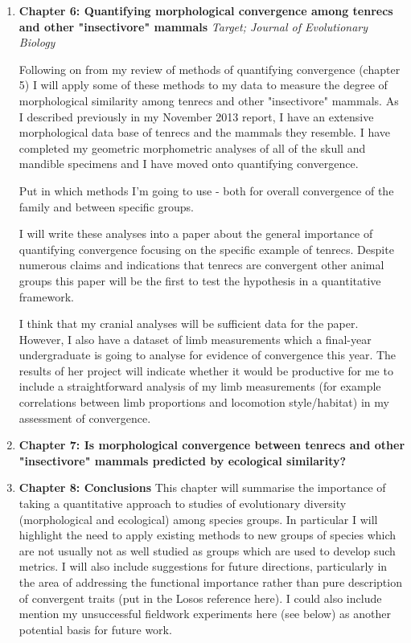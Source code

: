 \documentclass[12pt,a4paper]{article}
\begin{document}
\begin{enumerate}


\item \textbf{Chapter 6: Quantifying morphological convergence among tenrecs and other "insectivore" mammals}
\textit{Target; Journal of Evolutionary Biology}

Following on from my review of methods of quantifying convergence (chapter 5) I will apply some of these methods to my data to measure the degree of morphological similarity among tenrecs and other "insectivore" mammals.
As I described previously in my November 2013 report, I have an extensive morphological data base of tenrecs and the mammals they resemble. I have completed my geometric morphometric analyses of all of the skull and mandible specimens and I have moved onto quantifying convergence.


Put in which methods I'm going to use - both for overall convergence of the family and between specific groups.

I will write these analyses into a paper about the general importance of quantifying convergence focusing on the specific example of tenrecs. Despite numerous claims and indications that tenrecs are convergent other animal groups \citep[e.g.][]{Olson2013, Eisenberg1969, Soarimalala2011} this paper will be the first to test the hypothesis in a quantitative framework.

I think that my cranial analyses will be sufficient data for the paper. However, I also have a dataset of limb measurements which a final-year undergraduate is going to analyse for evidence of convergence this year. The results of her project will indicate whether it would be productive for me to include a straightforward analysis of my limb measurements (for example correlations between limb proportions and locomotion style/habitat) in my assessment of convergence.


\item \textbf{Chapter 7: Is morphological convergence between tenrecs and other "insectivore" mammals predicted by ecological similarity?}



\item \textbf{Chapter 8: Conclusions}
This chapter will summarise the importance of taking a quantitative approach to studies of evolutionary diversity (morphological and ecological) among species groups. In particular I will highlight the need to apply existing methods to new groups of species which are not usually not as well studied as groups which are used to develop such metrics. I will also include suggestions for future directions, particularly in the area of addressing the functional importance rather than pure description of convergent traits (put in the Losos reference here). I could also include mention my unsuccessful fieldwork experiments here (see below) as another potential basis for future work. 

\end{enumerate}
\end{document}
